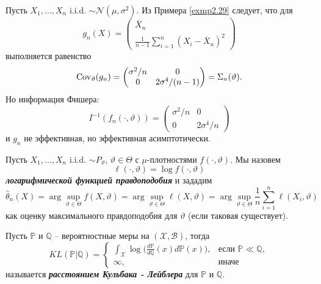 \begin{exmp}
	Пусть $X_1, \dots, X_n$ i.i.d. $\sim \mathcal{N}(\mu, \sigma^2)$. Из Примера \ref{exmp2.29} следует, что для
	\[ g_n(X) = \begin{pmatrix}
	\overline{X}_n \\
	\frac{1}{n-1} \sum_{i=1}^{n} (X_i - \overline{X}_n)^2
	\end{pmatrix}  \]
	выполняется равенство
	\[ \mathrm{Cov}_\vartheta(g_n) = \begin{pmatrix}
	\sigma^2/n & 0 \\
	0 & 2\sigma^4 / (n - 1)
	\end{pmatrix}  
	= \Sigma_n(\vartheta). \]
	Но информация Фишера:
	\[ I^{-1}(f_n(\cdot, \vartheta)) = \begin{pmatrix}
	\sigma^2/n & 0 \\
	0 & 2\sigma^4 / n
	\end{pmatrix}   \]
	и $g_n$ не эффективная, но эффективная асимптотически.
\end{exmp}

\begin{rmrk}
	Пусть $X_1, \dots, X_n$ i.i.d. $\sim P_\vartheta$, $\vartheta \in \Theta$ с $\mu$-плотностями $f(\cdot, \vartheta)$. Мы назовем
	\[ \ell(\cdot, \vartheta) = \log f(\cdot, \vartheta)  \] 
	\textbf{\textit{логарифмической функцией правдоподобия}} и зададим
	\[ \hat{\theta}_n(X) = \arg \sup_{\vartheta \in \Theta} f(X, \vartheta) = \arg \sup_{\vartheta \in \Theta} \ell (X, \vartheta) = \arg \sup_{\vartheta \in \Theta} \frac{1}{n} \sum_{i=1}^{n} \ell (X_i, \vartheta) \]
	как оценку максимального правдоподобия для $\vartheta$ (если таковая существует).
\end{rmrk}

\begin{defn}
	Пусть $\mathbb{P}$ и $\mathbb{Q}$ -- вероятностные меры на $(\mathcal{X}, \mathcal{B})$, тогда
	\[ KL(\mathbb{P}|\mathbb{Q}) =
	\left \{
	\begin{array}{cl}
	\int_{\mathcal{X}} \log\Big(\frac{d\mathbb{P}}{d\mathbb{Q}}(x) d\mathbb{P}(x) \Big), & \text{если } \mathbb{P} \ll \mathbb{Q}, \\
	\infty, & \text{иначе}  
	\end{array}
	\right.
	\]
	называется \textbf{\textit{расстоянием Кульбака - Лейблера}} для $\mathbb{P}$ и $\mathbb{Q}$.
\end{defn}

